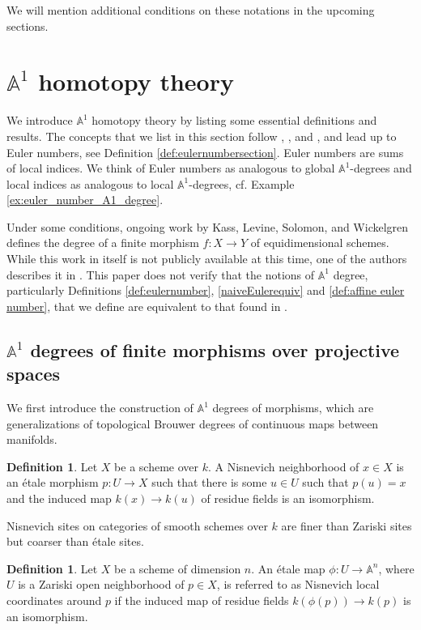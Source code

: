 \documentclass[12pt, reqno]{amsart}
\theoremstyle{definition}
\newtheorem{definition}[theorem]{Definition}
\newcommand{\A}{\mathbb{A}} %
\begin{document}
We will mention additional conditions on these notations in the upcoming sections.

\section{$\A^1$ homotopy theory} \label{sec: A1 homotopy theory}

We introduce $\A^1$ homotopy theory by listing some essential definitions and results. The concepts that we list in this section follow \cite{AWS}, \cite{kwcubic}, and \cite{kwBezout}, and lead up to Euler numbers, see Definition \ref{def:eulernumbersection}. Euler numbers are sums of local indices. We think of Euler numbers as analogous to global $\A^1$-degrees and local indices as analogous to local $\A^1$-degrees, cf. Example \ref{ex:euler_number_A1_degree}. 

Under some conditions, ongoing work by Kass, Levine, Solomon, and Wickelgren defines the degree of a finite morphism $f: X \rightarrow Y$ of equidimensional schemes. While this work in itself is not publicly available at this time, one of the authors describes it in \cite[Definition 10 and Theorem 9]{pw20}. This paper does not verify that the notions of $\A^1$ degree, particularly Definitions \ref{def:eulernumber}, \ref{naiveEulerequiv} and \ref{def:affine euler number}, that we define are equivalent to that found in \cite{pw20}.


\subsection{$\A^1$ degrees of finite morphisms over projective spaces}\label{subsec: A1 degree basic}
We first introduce the construction of $\A^1$ degrees of morphisms, which are generalizations of topological Brouwer degrees of continuous maps between manifolds.

\begin{definition}
Let $X$ be a scheme over $k$. A Nisnevich neighborhood of $x \in X$ is an \'etale morphism $p: U \rightarrow X$ such that there is some $u \in U$ such that $p(u) = x$ and the induced map $k(x) \rightarrow k(u)$ of residue fields is an isomorphism.
\end{definition}

Nisnevich sites on categories of smooth schemes over $k$ are finer than Zariski sites but coarser than \'etale sites.

\begin{definition}
Let $X$ be a scheme of dimension $n$. An \'etale map $\phi: U \rightarrow \A^n$, where $U$ is a Zariski open neighborhood of $p \in X$, is referred to as Nisnevich local coordinates around $p$ if the induced map of residue fields $k(\phi(p)) \rightarrow k(p)$ is an isomorphism.
\end{definition}
\end{document}
